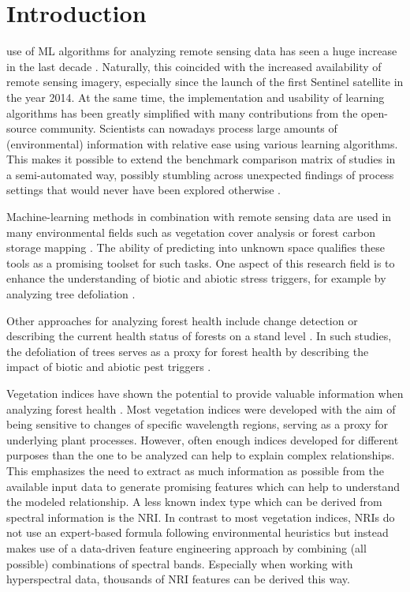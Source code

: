 \documentclass[peerreview]{IEEEtran}
\begin{document}
\section{Introduction}


 use of \ac{ML} algorithms for analyzing remote sensing data has seen a huge increase in the last decade \cite{lary2016}.
Naturally, this coincided with the increased availability of remote sensing imagery, especially since the launch of the first Sentinel satellite in the year 2014.
At the same time, the implementation and usability of learning algorithms has been greatly simplified with many contributions from the open-source community.
Scientists can nowadays process large amounts of (environmental) information with relative ease using various learning algorithms.
This makes it possible to extend the benchmark comparison matrix of studies in a semi-automated way, possibly stumbling across unexpected findings of process settings that would never have been explored otherwise \cite{ma2015}.


Machine-learning methods in combination with remote sensing data are used in many environmental fields such as vegetation cover analysis or forest carbon storage mapping \cite{mascaro2014, urban2018}.
The ability of predicting into unknown space qualifies these tools as a promising toolset for such tasks.
One aspect of this research field is to enhance the understanding of biotic and abiotic stress triggers, for example by analyzing tree defoliation \cite{hawrylo2018}.

Other approaches for analyzing forest health include change detection \cite{zhang2016} or describing the current health status of forests on a stand level \cite{townsend2012}.
In such studies, the defoliation of trees serves as a proxy for forest health by describing the impact of biotic and abiotic pest triggers \cite{townsend2012, goodbody2018}.

Vegetation indices have shown the potential to provide valuable information when analyzing forest health \cite{jiang2014, adamczyk2015}.
Most vegetation indices were developed with the aim of being sensitive to changes of specific wavelength regions, serving as a proxy for underlying plant processes.
However, often enough indices developed for different purposes than the one to be analyzed can help to explain complex relationships.
This emphasizes the need to extract as much information as possible from the available input data to generate promising features which can help to understand the modeled relationship.
A less known index type which can be derived from spectral information is the \ac{NRI}.
In contrast to most vegetation indices, \ac{NRI}s do not use an expert-based formula following environmental heuristics but instead makes use of a data-driven feature engineering approach by combining (all possible) combinations of spectral bands.
Especially when working with hyperspectral data, thousands of \ac{NRI} features can be derived this way.
\end{document}
